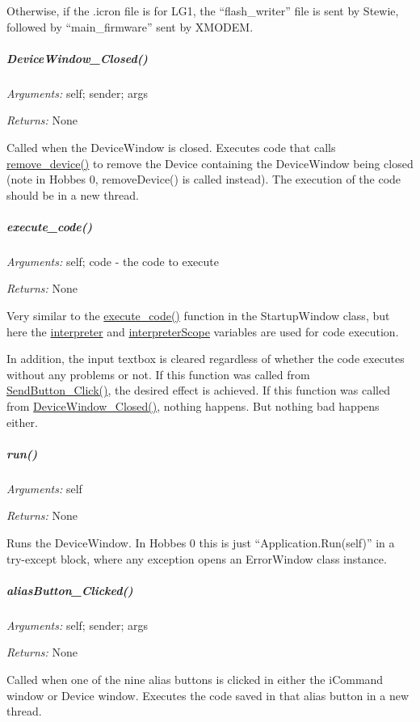 \documentclass[12pt,letterpaper]{article}
\begin{document}
Otherwise, if the .icron file is for LG1, the ``flash\_writer'' file is sent by Stewie, followed by ``main\_firmware'' sent by XMODEM.



%
%
\subparagraph{DeviceWindow\_Closed()}
\label{4.3.1.3.16}

\emph{Arguments:} self; sender; args

\emph{Returns:} None

Called when the DeviceWindow is closed. Executes code that calls \hyperref[4.1.1.0.2]{remove\_device()} to remove the Device containing the DeviceWindow being closed (note in Hobbes 0, removeDevice() is called instead). The execution of the code should be in a new thread.



%
%
\subparagraph{execute\_code()}
\label{4.3.1.3.17}

\emph{Arguments:} self; code - the code to execute

\emph{Returns:} None

Very similar to the \hyperref[4.1.1.1.5]{execute\_code()} function in the StartupWindow class, but here the \hyperref[4.3.2.2.6]{interpreter} and \hyperref[4.3.2.2.7]{interpreterScope} variables are used for code execution.

In addition, the input textbox is cleared regardless of whether the code executes without any problems or not. If this function was called from \hyperref[4.3.1.3.3]{SendButton\_Click()}, the desired effect is achieved. If this function was called from \hyperref[4.3.1.3.16]{DeviceWindow\_Closed()}, nothing happens. But nothing bad happens either.



%
%
\subparagraph{run()}
\label{4.3.1.3.18}

\emph{Arguments:} self

\emph{Returns:} None

Runs the DeviceWindow. In Hobbes 0 this is just ``Application.Run(self)'' in a try-except block, where any exception opens an ErrorWindow class instance.



%
%
\subparagraph{aliasButton\_Clicked()}
\label{4.3.1.3.19}

\emph{Arguments:} self; sender; args

\emph{Returns:} None

Called when one of the nine alias buttons is clicked in either the iCommand window or Device window. Executes the code saved in that alias button in a new thread.
\end{document}
